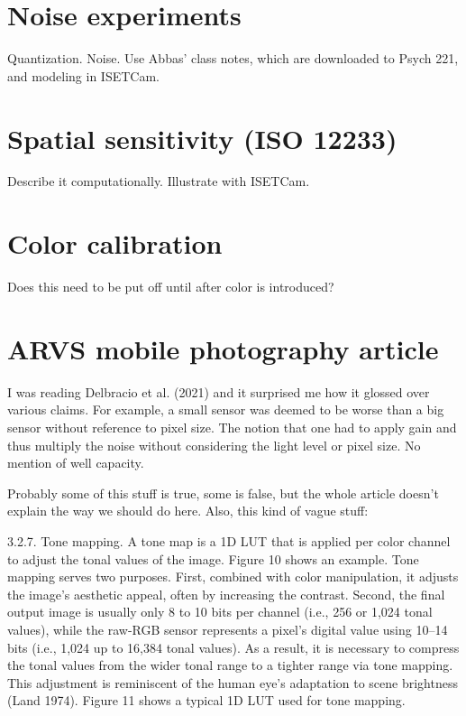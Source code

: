 \documentclass[
  letterpaper,
]{book}
\begin{document}
\section{Noise experiments}\label{noise-experiments}

Quantization. Noise. Use Abbas' class notes, which are downloaded to
Psych 221, and modeling in ISETCam.

\section{Spatial sensitivity (ISO
12233)}\label{spatial-sensitivity-iso-12233}

Describe it computationally. Illustrate with ISETCam.

\section{Color calibration}\label{color-calibration}

Does this need to be put off until after color is introduced?

\section{ARVS mobile photography
article}\label{arvs-mobile-photography-article}

I was reading Delbracio et al. (2021) and it surprised me how it glossed
over various claims. For example, a small sensor was deemed to be worse
than a big sensor without reference to pixel size. The notion that one
had to apply gain and thus multiply the noise without considering the
light level or pixel size. No mention of well capacity.

Probably some of this stuff is true, some is false, but the whole
article doesn't explain the way we should do here. Also, this kind of
vague stuff:

3.2.7. Tone mapping. A tone map is a 1D LUT that is applied per color
channel to adjust the tonal values of the image. Figure 10 shows an
example. Tone mapping serves two purposes. First, combined with color
manipulation, it adjusts the image's aesthetic appeal, often by
increasing the contrast. Second, the final output image is usually only
8 to 10 bits per channel (i.e., 256 or 1,024 tonal values), while the
raw-RGB sensor represents a pixel's digital value using 10--14 bits
(i.e., 1,024 up to 16,384 tonal values). As a result, it is necessary to
compress the tonal values from the wider tonal range to a tighter range
via tone mapping. This adjustment is reminiscent of the human eye's
adaptation to scene brightness (Land 1974). Figure 11 shows a typical 1D
LUT used for tone mapping.
\end{document}
